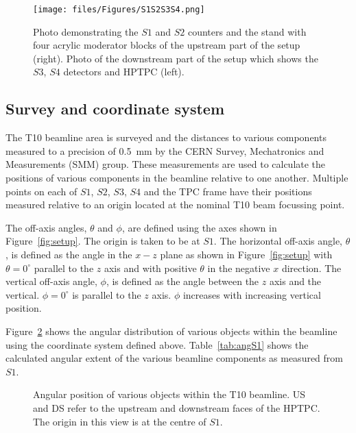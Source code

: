 \begin{figure}[t]
  \centering
  \texttt{[image: files/Figures/S1S2S3S4.png]}
  \caption{Photo demonstrating the $\mathit{S1}$ and $\mathit{S2}$ counters and the stand with four acrylic moderator blocks of the upstream part of the setup (right). Photo of the downstream part of the setup which shows the $\mathit{S3}$, $\mathit{S4}$ detectors and HPTPC (left).}
  \label{fig:modblocks}
\end{figure}

\subsection{Survey and coordinate system}
\label{sec:coord}
The T10 beamline area is surveyed and the distances to various components measured to a precision of 0.5~mm by the CERN Survey, Mechatronics and Measurements (SMM) group.
These measurements are used to calculate the positions of various components in the beamline relative to one another.
Multiple points on each of $\mathit{S1}$, $\mathit{S2}$, $\mathit{S3}$, $\mathit{S4}$ and the TPC frame have their positions measured relative to an origin located at the nominal T10 beam focussing point.

The off-axis angles, $\theta$ and $\phi$, are defined using the axes shown in Figure~\ref{fig:setup}.
The origin is taken to be at $\mathit{S1}$.
The horizontal off-axis angle, $\theta$, is defined as the angle in the $x-z$ plane as shown in Figure~\ref{fig:setup} with $\theta = 0^{\circ}$ parallel to the $z$ axis and with positive $\theta$ in the negative $x$ direction.
The vertical off-axis angle, $\phi$, is defined as the angle between the $z$ axis and the vertical.
$\phi = 0^{\circ}$ is parallel to the $z$ axis.
$\phi$ increases with increasing vertical position.

Figure~\ref{fig:angularDistS1} shows the angular distribution of various objects within the beamline using the coordinate system defined above. Table~\ref{tab:angS1} shows the calculated angular extent of the various beamline components as measured from $\mathit{S1}$.

\begin{figure}[ht]
  \begin{adjustbox}{max totalsize={0.7\textwidth}{.5\textheight},center}
    
  \end{adjustbox}
  \caption{Angular position of various objects within the T10 beamline. US and DS refer to the upstream and downstream faces of the HPTPC. The origin in this view is at the centre of $\mathit{S1}$.}
  \label{fig:angularDistS1}
\end{figure}

